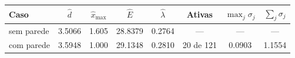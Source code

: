 \begin{tabular}{lccccccc}
\toprule
Caso & $\hat d$ & $\hat x_{\max}$ & $\hat E$ & $\hat\lambda$ & Ativas & $\max_j \sigma_j$ & $\sum_j \sigma_j$ \\
\midrule
sem parede & \num{3.5066} & \num{1.605} & \num{28.8379} & \num{0.2764} & --- & --- & --- \\
com parede & \num{3.5948} & \num{1.000} & \num{29.1348} & \num{0.2810} & 20 de 121 & \num{0.0903} & \num{1.1554} \\
\bottomrule
\end{tabular}
